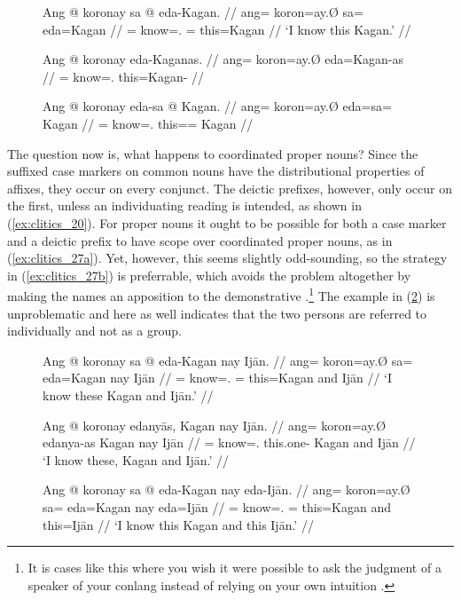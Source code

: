 \begin{figure}
\pex\label{ex:clitics_26}
\a\label{ex:clitics_26a}\begingl
	\gla Ang @ koronay sa @ eda-Kagan. //
	\glb ang= koron=ay.Ø sa= eda=Kagan //
	\glc \AgtT{}= know=\Fsg{}.\Top{} \Parg{}= this=Kagan //
	\glft `I know this Kagan.' //
\endgl

\a\label{ex:clitics_26b}\ljudge{*}\begingl
	\gla Ang @ koronay eda-Kaganas. //
	\glb ang= koron=ay.Ø eda=Kagan-as //
	\glc \AgtT{}= know=\Fsg{}.\Top{} this=Kagan-\Parg{} //
\endgl

\a\label{ex:clitics_26c}\ljudge{*}\begingl
	\gla Ang @ koronay eda-sa @ Kagan. //
	\glb ang= koron=ay.Ø eda=sa= Kagan //
	\glc \AgtT{}= know=\Fsg{}.\Top{} this=\Parg{}= Kagan //
\endgl
\xe
\end{figure}

The question now is, what happens to coordinated proper nouns? Since the
suffixed case markers on common nouns have the distributional properties of
affixes, they occur on every conjunct. The deictic prefixes, however, only
occur on the first, unless an individuating reading is intended, as shown in
(\ref{ex:clitics_20}). For proper nouns it ought to be possible for both a case
marker and a deictic prefix to have scope over coordinated proper nouns, as in
(\ref{ex:clitics_27a}). Yet, however, this seems slightly odd-sounding, so the
strategy in (\ref{ex:clitics_27b}) is preferrable, which avoids the problem
altogether by making the names an apposition to the demonstrative
.\footnote{It is cases like this where
you wish it were possible to ask the judgment of a speaker of your conlang
instead of relying on your own intuition%
.} The example in (\ref{ex:clitics_27c}) is
unproblematic and here as well indicates that the two persons are referred to
individually and not as a group.

\begin{figure}
\pex\label{ex:clitics_27}
\a\label{ex:clitics_27a}\begingl
	\gla Ang @ koronay sa @ eda-​Kagan nay Ijān. //
	\glb ang= koron=ay.Ø sa= eda=Kagan nay Ijān //
	\glc \AgtT{}= know=\Fsg{}.\Top{} \Parg{}= this=​Kagan and Ijān //
	\glft `I know these Kagan and Ijān.' //
\endgl

\a\label{ex:clitics_27b}\begingl
	\gla Ang @ koronay edanyās, Kagan nay Ijān. //
	\glb ang= koron=ay.Ø edanya-as Kagan nay Ijān //
	\glc \AgtT{}= know=\Fsg{}.\Top{} this.one-\Parg{} Kagan and Ijān //
	\glft `I know these, Kagan and Ijān.' //
\endgl

\a\label{ex:clitics_27c}\begingl
	\gla Ang @ koronay sa @ eda-​Kagan nay eda-​Ijān. //
	\glb ang= koron=ay.Ø sa= eda=​Kagan nay eda=Ijān //
	\glc \AgtT{}= know=\Fsg{}.\Top{} \Parg{}= this=​Kagan and this=​Ijān //
	\glft `I know this Kagan and this Ijān.' //
\endgl
\xe
\end{figure}

